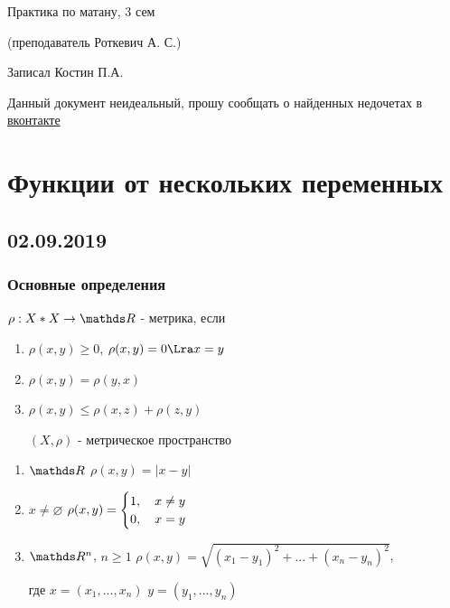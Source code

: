 \documentclass[12pt, fleqn]{article}
\begin{document}
\begin{center}
  \huge Практика по матану, 3 сем

  \Large (преподаватель Роткевич А. С.)

  \large Записал Костин П.А.
\end{center}

Данный документ неидеальный, прошу сообщать о найденных недочетах в \href{https://vk.com/drab_existence_a}{вконтакте}
\tableofcontents
\newpage

\section{Функции от нескольких переменных}
\subsection{02.09.2019}
\subsubsection{Основные определения}

\begin{definition}
    $\rho: X * X \ra \R$ - метрика, если
    \begin{enumerate}
    	\item $\rho(x,y) \geqslant 0$, $\rho(x,y)=0 \Lra x=y$
    	\item $\rho(x,y)=\rho(y,x)$
    	\item $\rho(x,y) \leqslant \rho(x,z)+\rho(z,y)$

    	$(X,\rho)$ - метрическое пространство
	\end{enumerate}
\end{definition}

\begin{examples}
    \begin{enumerate}
        \item $\R$ $\rho(x,y)=|x-y|$
        \item $x \neq \varnothing$ $\rho(x,y)=
            \begin{cases}
                1, \quad x \neq y\\
                0, \quad x=y
            \end{cases}$
        \item $\R^n$, $n \geqslant 1$ $\rho(x,y)=\sqrt{(x_1-y_1)^2+...+(x_n-y_n)^2}$,

        где $x=(x_1,...,x_n)$ $y=(y_1,...,y_n)$
    \end{enumerate}
\end{examples}
\end{document}
